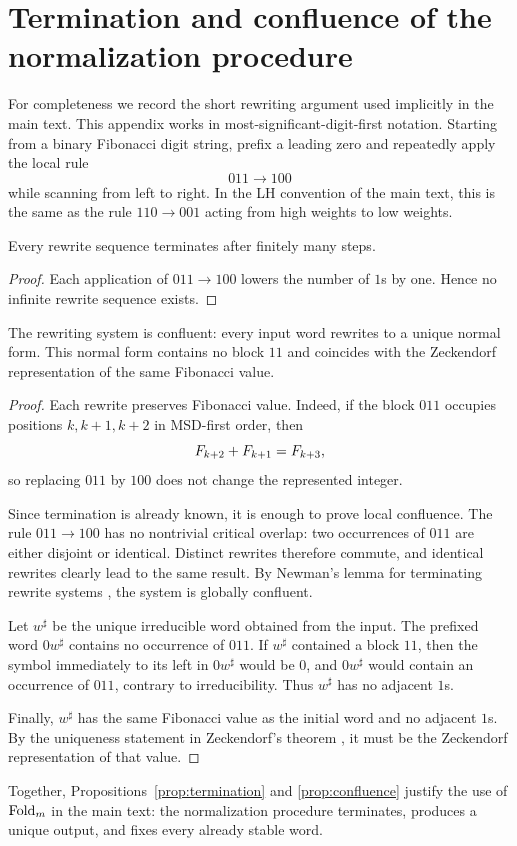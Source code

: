 \section{Termination and confluence of the normalization procedure}
\label{app:rewriting}

For completeness we record the short rewriting argument used implicitly in the main text. This appendix works in most-significant-digit-first notation. Starting from a binary Fibonacci digit string, prefix a leading zero and repeatedly apply the local rule
\[
011\to 100
\]
while scanning from left to right. In the LH convention of the main text, this is the same as the rule \(110\to 001\) acting from high weights to low weights.

\begin{proposition}\label{prop:termination}
Every rewrite sequence terminates after finitely many steps.
\end{proposition}

\begin{proof}
Each application of \(011\to 100\) lowers the number of \(1\)s by one. Hence no infinite rewrite sequence exists.
\end{proof}

\begin{proposition}\label{prop:confluence}
The rewriting system is confluent: every input word rewrites to a unique normal form. This normal form contains no block \(11\) and coincides with the Zeckendorf representation of the same Fibonacci value.
\end{proposition}

\begin{proof}
Each rewrite preserves Fibonacci value. Indeed, if the block \(011\) occupies positions \(k,k+1,k+2\) in MSD-first order, then
\[
F_{k+2}+F_{k+1}=F_{k+3},
\]
so replacing \(011\) by \(100\) does not change the represented integer.

Since termination is already known, it is enough to prove local confluence. The rule \(011\to 100\) has no nontrivial critical overlap: two occurrences of \(011\) are either disjoint or identical. Distinct rewrites therefore commute, and identical rewrites clearly lead to the same result. By Newman's lemma for terminating rewrite systems \cite[Section~2.4]{BaaderNipkow1998}, the system is globally confluent.

Let \(w^\sharp\) be the unique irreducible word obtained from the input. The prefixed word \(0w^\sharp\) contains no occurrence of \(011\). If \(w^\sharp\) contained a block \(11\), then the symbol immediately to its left in \(0w^\sharp\) would be \(0\), and \(0w^\sharp\) would contain an occurrence of \(011\), contrary to irreducibility. Thus \(w^\sharp\) has no adjacent \(1\)s.

Finally, \(w^\sharp\) has the same Fibonacci value as the initial word and no adjacent \(1\)s. By the uniqueness statement in Zeckendorf's theorem \cite{Lekkerkerker1952,Zeckendorf1972}, it must be the Zeckendorf representation of that value.
\end{proof}

Together, Propositions~\ref{prop:termination} and \ref{prop:confluence} justify the use of \(\mathrm{Fold}_m\) in the main text: the normalization procedure terminates, produces a unique output, and fixes every already stable word.
